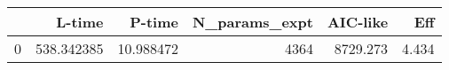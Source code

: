 \begin{tabular}{lrrrrr}
\toprule
{} &      L-time &     P-time &  N\_params\_expt &  AIC-like &    Eff \\
\midrule
0 &  538.342385 &  10.988472 &           4364 &  8729.273 &  4.434 \\
\bottomrule
\end{tabular}
